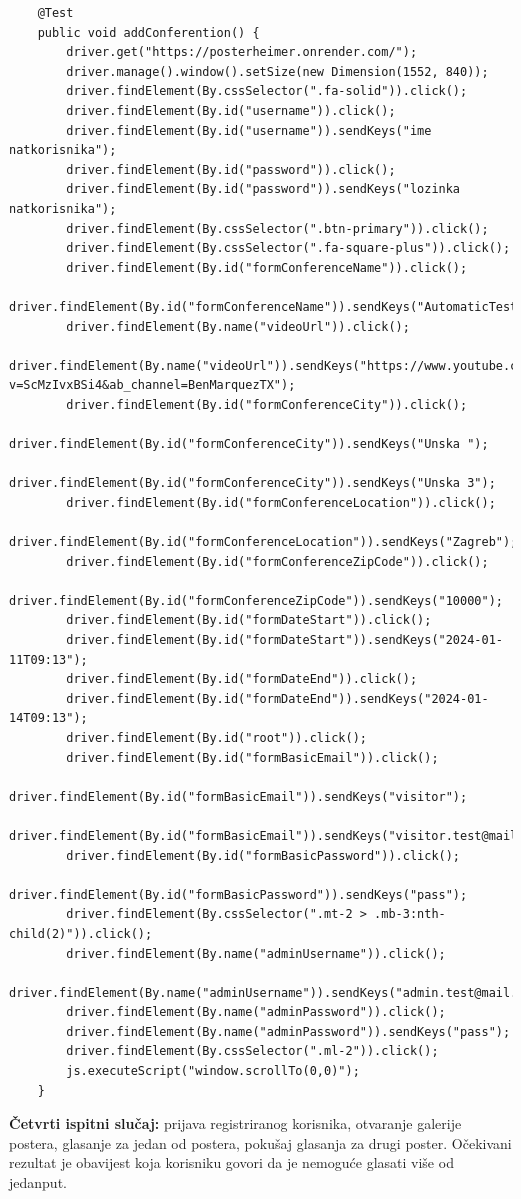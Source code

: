 \begin{lstlisting}
	@Test
	public void addConferention() {
		driver.get("https://posterheimer.onrender.com/");
		driver.manage().window().setSize(new Dimension(1552, 840));
		driver.findElement(By.cssSelector(".fa-solid")).click();
		driver.findElement(By.id("username")).click();
		driver.findElement(By.id("username")).sendKeys("ime natkorisnika");
		driver.findElement(By.id("password")).click();
		driver.findElement(By.id("password")).sendKeys("lozinka natkorisnika");
		driver.findElement(By.cssSelector(".btn-primary")).click();
		driver.findElement(By.cssSelector(".fa-square-plus")).click();
		driver.findElement(By.id("formConferenceName")).click();
		driver.findElement(By.id("formConferenceName")).sendKeys("AutomaticTestKonferencija");
		driver.findElement(By.name("videoUrl")).click();
		driver.findElement(By.name("videoUrl")).sendKeys("https://www.youtube.com/watch?v=ScMzIvxBSi4&ab_channel=BenMarquezTX");
		driver.findElement(By.id("formConferenceCity")).click();
		driver.findElement(By.id("formConferenceCity")).sendKeys("Unska ");
		driver.findElement(By.id("formConferenceCity")).sendKeys("Unska 3");
		driver.findElement(By.id("formConferenceLocation")).click();
		driver.findElement(By.id("formConferenceLocation")).sendKeys("Zagreb");
		driver.findElement(By.id("formConferenceZipCode")).click();
		driver.findElement(By.id("formConferenceZipCode")).sendKeys("10000");
		driver.findElement(By.id("formDateStart")).click();
		driver.findElement(By.id("formDateStart")).sendKeys("2024-01-11T09:13");
		driver.findElement(By.id("formDateEnd")).click();
		driver.findElement(By.id("formDateEnd")).sendKeys("2024-01-14T09:13");
		driver.findElement(By.id("root")).click();
		driver.findElement(By.id("formBasicEmail")).click();
		driver.findElement(By.id("formBasicEmail")).sendKeys("visitor");
		driver.findElement(By.id("formBasicEmail")).sendKeys("visitor.test@mail.hr");
		driver.findElement(By.id("formBasicPassword")).click();
		driver.findElement(By.id("formBasicPassword")).sendKeys("pass");
		driver.findElement(By.cssSelector(".mt-2 > .mb-3:nth-child(2)")).click();
		driver.findElement(By.name("adminUsername")).click();
		driver.findElement(By.name("adminUsername")).sendKeys("admin.test@mail.hr");
		driver.findElement(By.name("adminPassword")).click();
		driver.findElement(By.name("adminPassword")).sendKeys("pass");
		driver.findElement(By.cssSelector(".ml-2")).click();
		js.executeScript("window.scrollTo(0,0)");
	}
\end{lstlisting}
		 	
		 	
		\textbf{Četvrti ispitni slučaj:} prijava registriranog korisnika, otvaranje galerije postera, glasanje za jedan od postera, pokušaj glasanja za drugi poster. Očekivani rezultat je obavijest koja korisniku govori da je nemoguće glasati više od jedanput.
			
